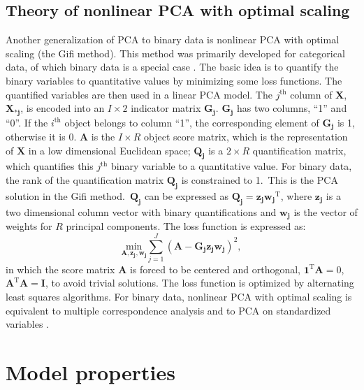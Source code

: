 \subsection{Theory of nonlinear PCA with optimal scaling}
Another generalization of PCA to binary data is nonlinear PCA with optimal scaling (the Gifi method). This method was primarily developed for categorical data, of which binary data is a special case \cite{gifi_B_90, de2009gifi}. The basic idea is to quantify the binary variables to quantitative values by minimizing some loss functions. The quantified variables are then used in a linear PCA model. The $j^{\text{th}}$ column of $\mathbf{X}$, $\mathbf{ X_{*j}}$, is encoded into an $ I \times 2 $ indicator matrix $\mathbf{G_j}$. $\mathbf{G_j}$ has two columns, ``1'' and ``0''. If the $i^{\text{th}}$ object belongs to column ``1'', the corresponding element of $\mathbf{ G_j }$  is 1, otherwise it is 0. $\mathbf{A}$ is the $I \times R$ object score matrix, which is the representation of $\mathbf{X}$ in a low dimensional Euclidean space; $\mathbf{ Q_j }$ is a $2 \times R$ quantification matrix, which quantifies this $j^{\text{th}}$ binary variable to a quantitative value. For binary data, the rank of the quantification matrix $\mathbf{ Q_j }$ is constrained to 1.~This is the PCA solution in the Gifi method.~$\mathbf{ Q_j }$ can be expressed as $\mathbf{ Q_j} = \mathbf{z_j}\mathbf{w_j}^{\text{T}}$, where $\mathbf{z_j}$ is a two dimensional column vector with binary quantifications and $\mathbf{w_j}$ is the vector of weights for $R$ principal components. The loss function is expressed as:
\begin{equation}
\underset{\mathbf{A,z_j,w_j}}{\text{min}} \sum_{j=1}^{J} {\mathbf{ ( A-G_j z_j w_j )}^2},
\end{equation}
in which the score matrix $\mathbf{A}$ is forced to be centered and orthogonal, $\mathbf{1}^{\text{T}}\mathbf{A}=0$, $\mathbf{A}^{\text{T}}\mathbf{A}=\mathbf{I}$, to avoid trivial solutions. The loss function is optimized by alternating least squares algorithms. For binary data, nonlinear PCA with optimal scaling is equivalent to multiple correspondence analysis and to PCA on standardized variables \cite{kiers1989three}.

\section{Model properties}
